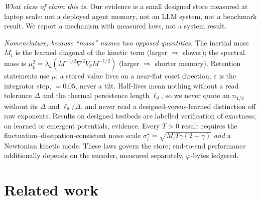 \documentclass{article}
\begin{document}
\emph{What class of claim this is.} Our evidence is a small designed store measured at laptop scale: not a deployed agent memory, not an LLM system, not a benchmark result. We report a mechanism with measured laws, not a system result.

{\emph{Nomenclature, because ``mass'' names two opposed quantities.} The inertial mass $M_i$ is the learned diagonal of the kinetic term (larger $\Rightarrow$ slower); the spectral mass is $\mu_k^2=\lambda_k(M^{-1/2}\nabla^2V_\theta M^{-1/2})$ (larger $\Rightarrow$ shorter memory). Retention statements use $\mu$; a stored value lives on a near-flat coset direction; $\varepsilon$ is the integrator step, $=0.05$, never a tilt. Half-lives mean nothing without a read tolerance $\Delta$ and the thermal persistence length $\ell_\theta$, so we never quote an $n_{1/2}$ without its $\Delta$ and $\ell_\theta/\Delta$, and never read a designed-versus-learned distinction off raw exponents. Results on designed testbeds are labelled verification of exactness; on learned or emergent potentials, evidence. Every $T>0$ result requires the fluctuation--dissipation-consistent noise scale $\sigma^\star_i=\sqrt{M_iT\gamma(2-\gamma)}$ \emph{and} a Newtonian kinetic mode. These laws govern the store; end-to-end performance additionally depends on the encoder, measured separately, $\varphi$-bytes ledgered.\par}

\section{Related work}\label{sec:related}
\end{document}
